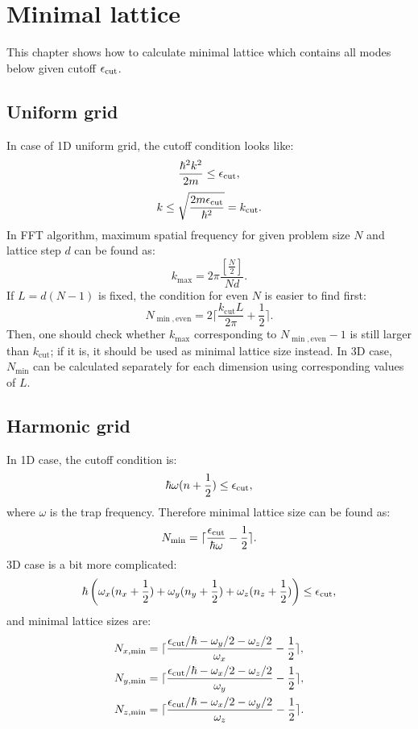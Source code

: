 \chapter{Minimal lattice}
\label{cha:appendix:minimal-lattice}

This chapter shows how to calculate minimal lattice which contains all modes below given cutoff $\epsilon_{\mathrm{cut}}$.


\section{Uniform grid}

In case of 1D uniform grid, the cutoff condition looks like:
\[
	\frac{\hbar^2 k^2}{2 m} \le \epsilon_{\mathrm{cut}},
\]
\[
	k \le \sqrt{\frac{2 m \epsilon_{\mathrm{cut}}}{\hbar^2}} = k_{\mathrm{cut}}.
\]
In FFT algorithm, maximum spatial frequency for given problem size $N$ and lattice step $d$ can be found as:
\[
	k_{\max} = 2 \pi \frac{ \left[ \frac{N}{2} \right] }{N d}.
\]
If $L = d (N - 1)$ is fixed, the condition for even $N$ is easier to find first:
\[
	N_{\min,\mathrm{even}} = 2 \lceil
		\frac{k_{\mathrm{cut}} L}{2 \pi} + \frac{1}{2}
	\rceil.
\]
Then, one should check whether $k_{\max}$ corresponding to $N_{\min,\mathrm{even}} - 1$ is still larger than $k_{\mathrm{cut}}$; if it is, it should be used as minimal lattice size instead.
In 3D case, $N_{\min}$ can be calculated separately for each dimension using corresponding values of $L$.


\section{Harmonic grid}

In 1D case, the cutoff condition is:
\[
	\hbar \omega ( n + \frac{1}{2} ) \le \epsilon_{\mathrm{cut}},
\]
where $\omega$ is the trap frequency.
Therefore minimal lattice size can be found as:
\[
	N_{\min} = \lceil \frac{\epsilon_{\mathrm{cut}}}{\hbar \omega} - \frac{1}{2} \rceil.
\]
3D case is a bit more complicated:
\[
	\hbar \left(
		\omega_x (n_x + \frac{1}{2})
		+ \omega_y (n_y + \frac{1}{2})
		+ \omega_z (n_z + \frac{1}{2})
	\right) \le \epsilon_{\mathrm{cut}},
\]
and minimal lattice sizes are:
\begin{equation*}
\begin{split}
	N_{x,\min} & = \lceil
		\frac{\epsilon_{\mathrm{cut}} / \hbar - \omega_y / 2 - \omega_z / 2}{\omega_x} - \frac{1}{2}
	\rceil, \\
	N_{y,\min} & = \lceil
		\frac{\epsilon_{\mathrm{cut}} / \hbar - \omega_x / 2 - \omega_z / 2}{\omega_y} - \frac{1}{2}
	\rceil, \\
	N_{z,\min} & = \lceil
		\frac{\epsilon_{\mathrm{cut}} / \hbar - \omega_x / 2 - \omega_y / 2}{\omega_z} - \frac{1}{2}
	\rceil.
\end{split}
\end{equation*}
